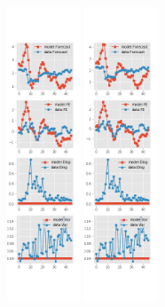 \documentclass[]{article}
\begin{document}
\begin{figure}[ht]
\begin{subfigure}[b]{\textwidth}
		\includegraphics[width=0.24\textwidth]{figures/spf_ni_est_joint_diag1.png}
		\includegraphics[width=0.24\textwidth]{figures/spf_ni_est_joint_diag2.png}

\end{subfigure}
\end{figure}
\end{document}
